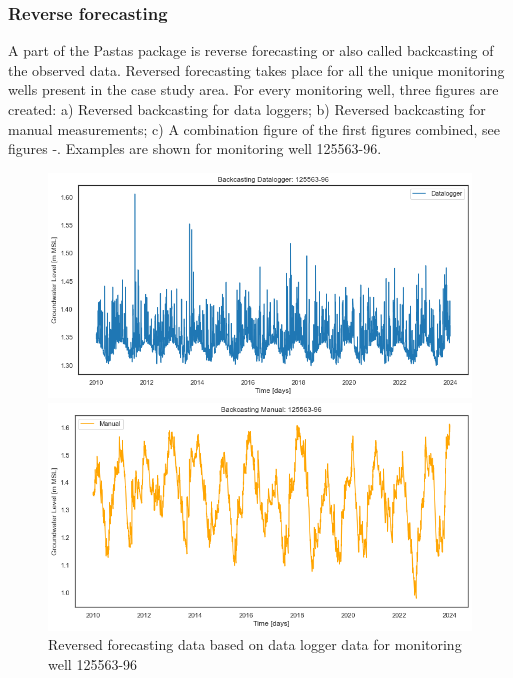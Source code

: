 \subsubsection{Reverse forecasting}
A part of the Pastas package is reverse forecasting or also called backcasting of the observed data. Reversed forecasting takes place for all the unique monitoring wells present in the case study area. For every monitoring well, three figures are created: a) Reversed backcasting for data loggers; b) Reversed backcasting for manual measurements; c) A combination figure of the first figures combined, see figures -. Examples are shown for monitoring well 125563-96. 

\begin{figure}
    \centering
    \begin{minipage}{0.32\textwidth}
        \centering
        \includegraphics[width=\linewidth]{frontmatter/Heijplaat-fig/dl12556396.png}
        \caption{Reversed forecasting data based on data logger data for monitoring well 125563-96}
        \label{dlheij}
    \end{minipage}
    \hfill
    \begin{minipage}{0.32\textwidth}
        \centering
        \includegraphics[width=\linewidth]{frontmatter/Heijplaat-fig/man12556396.png}

\end{minipage}
\end{figure}
